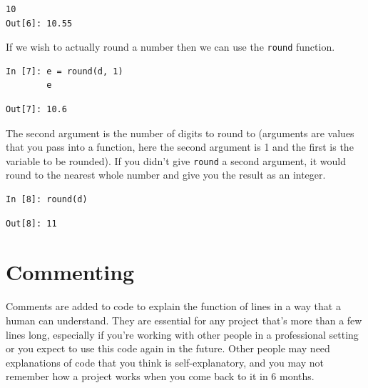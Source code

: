 \begin{lstlisting}[style=PY, backgroundcolor=\color{white}]
        10
Out[6]: 10.55
\end{lstlisting}
If we wish to actually round a number then we can use the \texttt{round} function.
\begin{lstlisting}[style=PY]
In [7]: e = round(d, 1)
        e
\end{lstlisting}
\begin{lstlisting}[style=PY, backgroundcolor=\color{white}]
Out[7]: 10.6
\end{lstlisting}
The second argument is the number of digits to round to (arguments are values that you pass into a function, here the second argument is 1 and the first is the variable to be rounded). If you didn't give \texttt{round} a second argument, it would round to the nearest whole number and give you the result as an integer.
\begin{lstlisting}[style=PY]
In [8]: round(d)
\end{lstlisting}
\begin{lstlisting}[style=PY, backgroundcolor=\color{white}]
Out[8]: 11
\end{lstlisting}


\section{Commenting}
Comments are added to code to explain the function of lines in a way that a human can understand. They are essential for any project that's more than a few lines long, especially if you're working with other people in a professional setting or you expect to use this code again in the future. Other people may need explanations of code that you think is self-explanatory, and you may not remember how a project works when you come back to it in 6 months.

